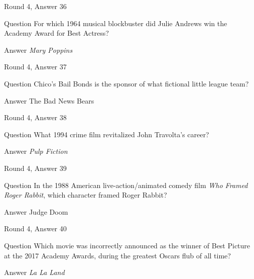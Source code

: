 \documentclass[11pt]{beamer}
\begin{document}
\begin{frame}[t]{Round 4, Answer 36}
\vspace{2em}
\begin{block}{Question}
For which 1964 musical blockbuster did Julie Andrews win the Academy Award for Best Actress?
\end{block}
\pause{}
\begin{block}{Answer}
\emph{Mary Poppins}
\end{block}
\end{frame}
    

\begin{frame}[t]{Round 4, Answer 37}
\vspace{2em}
\begin{block}{Question}
Chico's Bail Bonds is the sponsor of what fictional little league team?
\end{block}
\pause{}
\begin{block}{Answer}
The Bad News Bears
\end{block}
\end{frame}
    

\begin{frame}[t]{Round 4, Answer 38}
\vspace{2em}
\begin{block}{Question}
What 1994 crime film revitalized John Travolta's career?
\end{block}
\pause{}
\begin{block}{Answer}
\emph{Pulp Fiction}
\end{block}
\end{frame}
    

\begin{frame}[t]{Round 4, Answer 39}
\vspace{2em}
\begin{block}{Question}
In the 1988 American live-action/animated comedy film \emph{Who Framed Roger Rabbit}, which character framed Roger Rabbit?
\end{block}
\pause{}
\begin{block}{Answer}
Judge Doom
\end{block}
\end{frame}
    

\begin{frame}[t]{Round 4, Answer 40}
\vspace{2em}
\begin{block}{Question}
Which movie was incorrectly announced as the winner of Best Picture at the 2017 Academy Awards, during the greatest Oscars flub of all time?
\end{block}
\pause{}
\begin{block}{Answer}
\emph{La La Land}
\end{block}
\end{frame}
    
\end{document}
